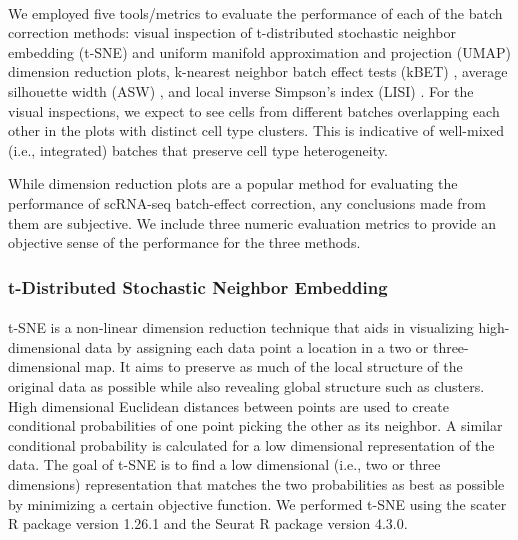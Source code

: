 \documentclass[unnumsec,webpdf,contemporary,large]{oup-authoring-template}%
\theoremstyle{thmstyleone}%
\theoremstyle{thmstyletwo}%
\theoremstyle{thmstylethree}%
\begin{document}
\paragraph*{}
We employed five tools/metrics to evaluate the performance of each of the batch correction methods: visual inspection of t-distributed stochastic neighbor embedding (t-SNE) \citep{van2008visualizing} and uniform manifold approximation and projection (UMAP) \citep{mcinnes2018umap} dimension reduction plots, k-nearest neighbor batch effect tests (kBET) \citep{buttner2019test}, average silhouette width (ASW) \citep{rousseeuw1987silhouettes}, and local inverse Simpson's index (LISI) \citep{korsunsky2019fast}. For the visual inspections, we expect to see cells from different batches overlapping each other in the plots with distinct cell type clusters. This is indicative of well-mixed (i.e., integrated) batches that preserve cell type heterogeneity.

While dimension reduction plots are a popular method for evaluating the performance of scRNA-seq batch-effect correction, any conclusions made from them are subjective. We include three numeric evaluation metrics to provide an objective sense of the performance for the three methods.

\subsubsection*{t-Distributed Stochastic Neighbor Embedding}

\paragraph*{}
t-SNE is a non-linear dimension reduction technique \citep{van2008visualizing} that aids in visualizing high-dimensional data by assigning each data point a location in a two or three-dimensional map. It aims to preserve as much of the local structure of the original data as possible while also revealing global structure such as clusters. High dimensional Euclidean distances between points are used to create conditional probabilities of one point picking the other as its neighbor. A similar conditional probability is calculated for a low dimensional representation of the data. The goal of t-SNE is to find a low dimensional (i.e., two or three dimensions) representation that matches the two probabilities as best as possible by minimizing a certain objective function. We performed t-SNE using the scater R package \citep{davis2017scater} version 1.26.1 and the Seurat R package \citep{stuart2019comprehensive} version 4.3.0.
\end{document}
